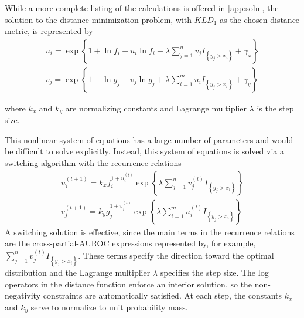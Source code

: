 While a more complete listing of the calculations is offered in \ref{app:soln}, the solution to the distance minimization problem, with $KLD_1$ as the chosen distance metric, is represented by
%
\begin{align}
    u_i = \exp{ \left\{ 1 + \ln f_i + u_i \ln f_i
        + \lambda \sum_{j = 1}^{n} v_j I_{\left\{ y_j > x_i \right\}} + \gamma_x \right\} } \\
    v_j = \exp{ \left\{ 1 + \ln g_j + v_j \ln g_j
        + \lambda \sum_{i = 1}^{m} u_i I_{\left\{ y_j > x_i \right\}} + \gamma_y \right\} }
\end{align}

\noindent where $k_x$ and $k_y$ are normalizing constants and Lagrange multiplier $\lambda$ is the step size.

%
This nonlinear system of equations has a large number of parameters and would be difficult to solve explicitly.
%
Instead, this system of equations is solved via a switching algorithm with the recurrence relations
%
\begin{align}
%
    u_i^{(t+1)} = k_x f_i ^{1 + u_i^{(t)}}
            \exp{ \left\{ \lambda \sum_{j = 1}^{n} v_j^{(t)} I_{\left\{ y_j > x_i \right\}} \right\} } \\
%
    v_j^{(t+1)} = k_y g_j ^{1 + v_j^{(t)}}
            \exp{ \left\{ \lambda \sum_{i = 1}^{m} u_i^{(t)} I_{\left\{ y_j > x_i \right\}}  \right\} }
%
\end{align}
%
\noindent A switching solution is effective, since the main terms in the recurrence relations are the cross-partial-AUROC expressions represented by, for example, $\sum_{j = 1}^{n} v_j^{(t)} I_{\left\{ y_j > x_i \right\}}$.
%
These terms specify the direction toward the optimal distribution and the Lagrange multiplier $\lambda$ specifies the step size.
The log operators in the distance function enforce an interior solution, so the non-negativity constraints are automatically satisfied.
At each step, the constants $k_x$ and $k_y$ serve to normalize to unit probability mass.

%



